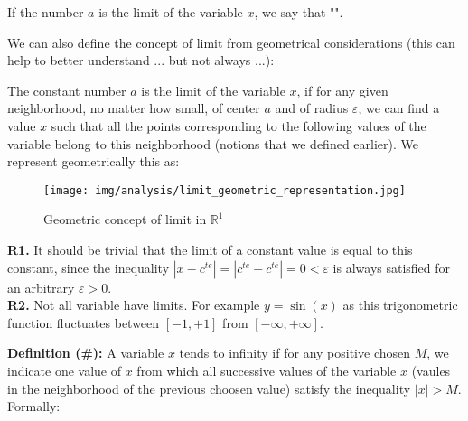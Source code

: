 	If the number $a$ is the limit of the variable $x$, we say that "".

	We can also define the concept of limit from geometrical considerations (this can help to better understand ... but not always ...):
	
	The constant number $a$ is the limit of the variable $x$, if for any given neighborhood, no matter how small, of center $a$ and of radius $\varepsilon$, we can find a value $x$ such that all the points corresponding to the following values of the variable belong to this neighborhood (notions that we defined earlier). We represent geometrically this as:
	\begin{figure}[H]
		\centering
		\texttt{[image: img/analysis/limit\_geometric\_representation.jpg]}
		\caption{Geometric concept of limit in $\mathbb{R}^1$}
	\end{figure}
	\begin{tcolorbox}[title=Remark,colframe=black,arc=10pt]
	\textbf{R1.} It should be trivial that the limit of a constant value is equal to this constant, since the inequality $|x-c^{te}|=|c^{te}-c^{te}|=0<\varepsilon $ is always satisfied for an arbitrary $\varepsilon>0$.\\
	
	\textbf{R2.}  Not all variable have limits. For example $y=\sin(x)$ as this trigonometric function fluctuates between $[-1,+1]$ from $[-\infty,+\infty]$.
	\end{tcolorbox}
	
	\textbf{Definition (\#\mydef):} A variable $x$ tends to infinity if for any positive chosen $M$, we indicate one value of $x$ from which all successive values of the variable $x$ (vaules in the neighborhood of the previous choosen value) satisfy the inequality $|x|>M$. Formally:
	

